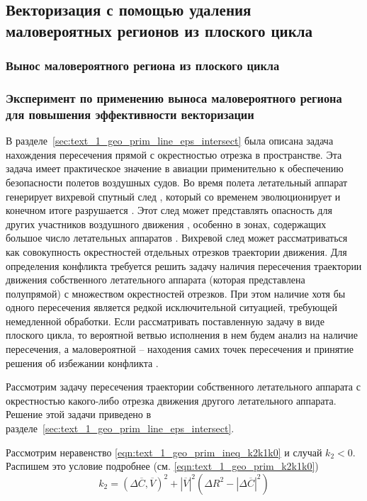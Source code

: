 \subsection{Векторизация с помощью удаления маловероятных регионов из плоского цикла}

\subsubsection{Вынос маловероятного региона из плоского цикла}

\subsubsection{Эксперимент по применению выноса маловероятного региона для повышения эффективности векторизации}

В разделе~\ref{sec:text_1_geo_prim_line_eps_intersect} была описана задача нахождения пересечения прямой с окрестностью отрезка в пространстве.
Эта задача имеет практическое значение в авиации применительно к обеспечению безопасности полетов воздушных судов.
Во время полета летательный аппарат генерирует вихревой спутный след \cite{Aubakirov1999Wake}, который со временем эволюционирует и конечном итоге разрушается \cite{Vyshinsky2006Wake}.
Этот след может представлять опасность для других участников воздушного движения \cite{Babkin2008Wake}, особенно в зонах, содержащих большое число летательных аппаратов \cite{Burluzky2014Wake}.
Вихревой след может рассматриваться как совокупность окрестностей отдельных отрезков траектории движения.
Для определения конфликта требуется решить задачу наличия пересечения траектории движения собственного летательного аппарата (которая представлена полупрямой) с множеством окрестностей отрезков.
При этом наличие хотя бы одного пересечения является редкой исключительной ситуацией, требующей немедленной обработки.
Если рассматривать поставленную задачу в виде плоского цикла, то вероятной ветвью исполнения в нем будем анализ на наличие пересечения, а маловероятной -- находения самих точек пересечения и принятие решения об избежании конфликта \cite{Rybakov2017Flight,Rybakov2022VecGeom}.

Рассмотрим задачу пересечения траектории собственного летательного аппарата с окрестностью какого-либо отрезка движения другого летательного аппарата.
Решение этой задачи приведено в разделе~\ref{sec:text_1_geo_prim_line_eps_intersect}.

Рассмотрим неравенство \eqref{eqn:text_1_geo_prim_ineq_k2k1k0} и случай $k_2 < 0$.
Распишем это условие подробнее (см. \eqref{eqn:text_1_geo_prim_k2k1k0})
\begin{equation}
	k_2 = (\Delta \overline{C}, \overline{V})^2 + |\overline{V}|^2 \left( \Delta R^2 - |\Delta \overline{C}|^2 \right)
\end{equation}

